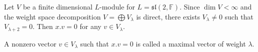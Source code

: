 Let $V$ be a finite dimensional $L$-module for $L = \mathfrak{sl}(2, \mathbb{F})$. Since $\dim V < \infty$ and the weight space decomposition $V = \bigoplus V_\lambda$ is direct, there exists $V_\lambda \neq 0$ such that $V_{\lambda+2} = 0$. Then $x.v = 0$ for any $v \in V_\lambda$.

A nonzero vector $v \in V_\lambda$ such that $x.v = 0$ is called a maximal vector of weight $\lambda$.
